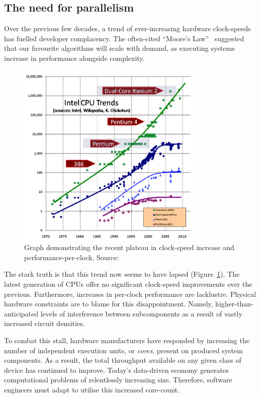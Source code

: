 \subsection{The need for parallelism}

Over the previous few decades, a trend of ever-increasing hardware clock-speeds has fuelled developer complacency.
The often-cited ``Moore's Law''~\cite{moores_law} suggested that our favourite algorithms will scale with demand, as executing systems increase in performance alongside complexity.

\begin{figure}[h]
  \includegraphics[width=0.8\textwidth]{./figures/free_lunch_over.png}
  \caption{Graph demonstrating the recent plateau in clock-speed increase and performance-per-clock. Source:~\cite{free_lunch_over}}
  \label{fig:free_lunch_over}
\end{figure}

The stark truth is that this trend now seems to have lapsed (Figure~\ref{fig:free_lunch_over}).
The latest generation of \acp{CPU} offer no significant clock-speed improvements over the previous. Furthermore, increases in per-clock performance are lacklustre.
Physical hardware constraints are to blame for this disappointment. Namely, higher-than-anticipated levels of interference between subcomponents as a result of vastly increased circuit densities.

To combat this stall, hardware manufacturers have responded by increasing the number of independent execution units, or \emph{cores}, present on produced system components. As a result, the total throughput available on any given class of device has continued to improve.
Today's data-driven economy generates computational problems of relentlessly increasing size. Therefore, software engineers must adapt to utilise this increased core-count.


